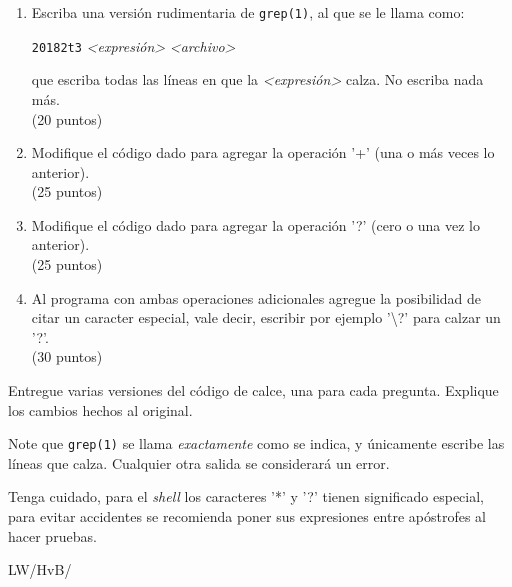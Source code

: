 \documentclass[english, spanish, fleqn]{article}
\begin{document}
  \begin{enumerate}
  \item %
    Escriba una versión rudimentaria de \texttt{grep(1)},
    al que se le llama como:
    
    \qquad\texttt{20182t3} \emph{<expresión>} \emph{<archivo>}

    que escriba todas las líneas en que la \emph{<expresión>} calza.
    No escriba nada más.
    \\ \hspace*{\fill}(20 puntos)
  \item %
    Modifique el código dado para agregar la operación '+'
    (una o más veces lo anterior).
    \\ \hspace*{\fill}(25 puntos)
  \item %
    Modifique el código dado para agregar la operación '?'
    (cero o una vez lo anterior).
    \\ \hspace*{\fill}(25 puntos)
  \item %
    Al programa con ambas operaciones adicionales
    agregue la posibilidad de citar un caracter especial,
    vale decir,
    escribir por ejemplo '\textbackslash?' para calzar un '?'.
    \\ \hspace*{\fill}(30 puntos)
  \end{enumerate}
  Entregue varias versiones del código de calce,
  una para cada pregunta.
  Explique los cambios hechos al original.

  Note que \texttt{grep(1)}
  se llama \emph{exactamente} como se indica,
  y únicamente escribe las líneas que calza.
  Cualquier otra salida se considerará un error.
  
  Tenga cuidado,
  para el \emph{\foreignlanguage{english}{shell}} los caracteres '*' y '?'
  tienen significado especial,
  para evitar accidentes se recomienda poner sus expresiones entre apóstrofes
  al hacer pruebas.


  \vfill\hfill LW/HvB/\LaTeXe
\end{document}
